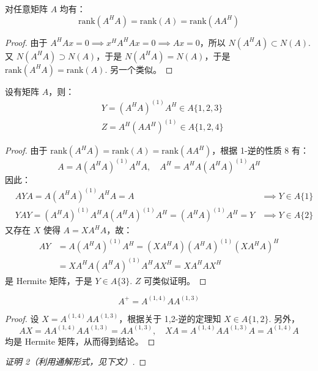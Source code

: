 \begin{lemma}
对任意矩阵 $A$ 均有：
\[
    \text{rank}(A^HA)=\text{rank}(A)=\text{rank}(AA^H)
\]
\end{lemma}
\begin{proof}
由于 $A^HAx=0\implies x^HA^HAx=0\implies Ax=0$，所以 $N(A^HA)\subset N(A)$.  又 $N(A^HA)\supset N(A)$，于是 $N(A^HA)=N(A)$，于是 $\text{rank}(A^HA)=\text{rank}(A)$. 另一个类似。
\end{proof}

\begin{theorem}
设有矩阵 $A$，则：
\begin{align*}
    &Y=(A^HA)^{(1)}A^H\in A\{1,2,3\}\\
    &Z=A^H(AA^H)^{(1)}\in A\{1,2,4\}
\end{align*}
\end{theorem}
\begin{proof}
由于 $\text{rank}(A^HA)=\text{rank}(A)=\text{rank}(AA^H)$，根据 1-逆的性质 8 有：
\[
    A=A(A^HA)^{(1)}A^HA,\quad A^H=A^HA(A^HA)^{(1)}A^H
\]
因此：
\begin{align*}
    &AYA=A(A^HA)^{(1)}A^HA=A&\implies Y\in A\{1\}\\
    &YAY=(A^HA)^{(1)}A^HA(A^HA)^{(1)}A^H=(A^HA)^{(1)}A^H=Y&\implies Y\in A\{2\}
\end{align*}
又存在 $X$ 使得 $A=XA^HA$，故：
\begin{align*}
    AY&=A(A^HA)^{(1)}A^H=(XA^HA)(A^HA)^{(1)}(XA^HA)^H\\
    &=XA^HA(A^HA)^{(1)}A^HAX^H=XA^HAX^H
\end{align*}
是 Hermite 矩阵，于是 $Y\in A\{3\}$.
$Z$ 可类似证明。
\end{proof}

\begin{theorem}
\[
    A^+=A^{(1,4)}AA^{(1,3)}
\]
\end{theorem}
\begin{proof}
设 $X=A^{(1,4)}AA^{(1,3)}$，根据关于 1,2-逆的定理知 $X\in A\{1,2\}$. 另外，
\[
    AX=AA^{(1,4)}AA^{(1,3)}=AA^{(1,3)},\quad XA=A^{(1,4)}AA^{(1,3)}A=A^{(1,4)}A
\]
均是 Hermite 矩阵，从而得到结论。
\end{proof}
\begin{proof}[证明 2（利用通解形式，见下文）]
{\color{red}{TODO}}
\end{proof}

